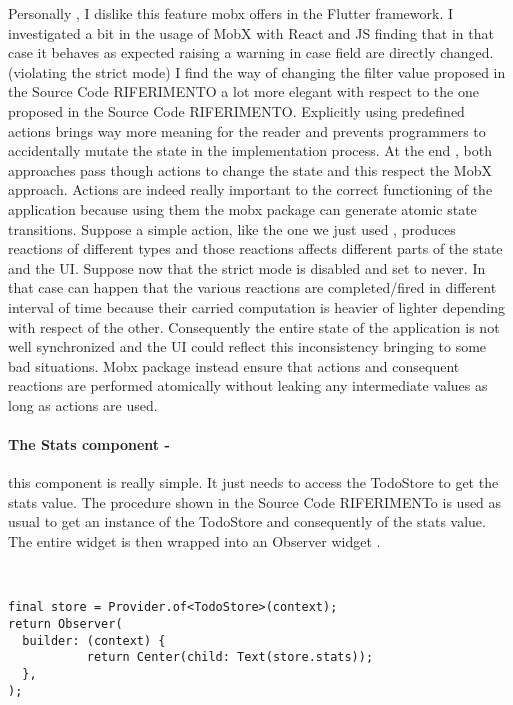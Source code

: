 Personally , I dislike this feature mobx offers in the Flutter framework. I investigated a bit in the usage of MobX with React and JS finding that in that case it behaves as expected raising a warning in case field are directly changed. (violating the strict mode) I find the way of changing the filter value proposed in the Source Code RIFERIMENTO a lot more elegant with respect to the one proposed in the Source Code RIFERIMENTO. Explicitly using predefined actions brings way more meaning for the reader and prevents programmers to accidentally mutate the state in the implementation process. At the end , both approaches pass though actions to change the state and this respect the MobX approach. Actions are indeed really important to the correct functioning of the application because using them the mobx package can generate atomic state transitions. Suppose a simple action, like the one we just used , produces reactions of different types and those reactions affects different parts of the state and the UI. Suppose now that the strict mode is disabled and set to never. In that case can happen that the various reactions are completed/fired in different interval of time because their carried computation is heavier of lighter depending with respect of the other. Consequently the entire state of the application is not well synchronized and the UI could reflect this inconsistency bringing to some bad situations. Mobx package instead ensure that actions and consequent reactions are performed atomically without leaking any intermediate values as long as actions are used.
\paragraph{The Stats component - }
\label{subpar:todo_app_bloc_core_state} this component is really simple. It just needs to access the TodoStore to get the stats value. The procedure shown in the Source Code RIFERIMENTo is used as usual to get an instance of the TodoStore and consequently of the stats value. The entire widget is then wrapped into an Observer widget .
\begin{code}
\mbox{}\\
 \mbox{}
		\label{code:2.14}
\begin{verbatim}
final store = Provider.of<TodoStore>(context);
return Observer(
  builder: (context) {
           return Center(child: Text(store.stats));
  },
);
\end{verbatim}
\mbox{}
\end{code}

